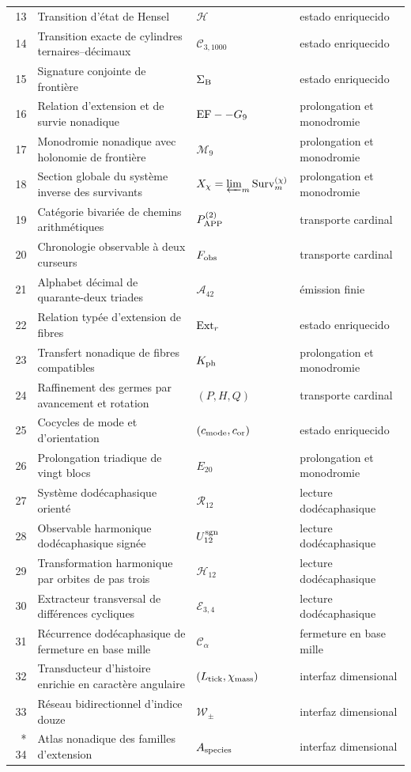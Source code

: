 \begin{longtable}{@{}r >{\raggedright\arraybackslash}p{}
  >{\raggedright\arraybackslash}p{}
  >{\raggedright\arraybackslash}p{}@{}}
13 & Transition d'état de Hensel
  & \(\mathcal H\) & estado enriquecido \\
14 & Transition exacte de cylindres ternaires--décimaux
  & \(\mathcal C_{3,1000}\) & estado enriquecido \\
15 & Signature conjointe de frontière
  & \(\Sigma_{\rm B}\) & estado enriquecido \\
16 & Relation d'extension et de survie nonadique
  & \({\rm EF}\text{--}G_9\) & prolongation et monodromie \\
17 & Monodromie nonadique avec holonomie de frontière
  & \(\mathcal M_9\) & prolongation et monodromie \\
18 & Section globale du système inverse des survivants
  & \(X_\chi=\varprojlim_m{\rm Surv}^{(\chi)}_m\)
  & prolongation et monodromie \\
19 & Catégorie bivariée de chemins arithmétiques
  & \(\mathcal P_{\rm APP}^{(2)}\) & transporte cardinal \\
20 & Chronologie observable à deux curseurs
  & \(F_{\rm obs}\) & transporte cardinal \\
21 & Alphabet décimal de quarante-deux triades
  & \(\mathcal A_{42}\) & émission finie \\
22 & Relation typée d'extension de fibres
  & \({\rm Ext}_r\) & estado enriquecido \\
23 & Transfert nonadique de fibres compatibles
  & \(K_{\rm ph}\) & prolongation et monodromie \\
24 & Raffinement des germes par avancement et rotation
  & \((P,H,Q)\) & transporte cardinal \\
25 & Cocycles de mode et d'orientation
  & \((c_{\rm mode},c_{\rm or})\) & estado enriquecido \\
26 & Prolongation triadique de vingt blocs
  & \(E_{20}\) & prolongation et monodromie \\
27 & Système dodécaphasique orienté
  & \(\mathcal R_{12}\) & lecture dodécaphasique \\
28 & Observable harmonique dodécaphasique signée
  & \(U_{12}^{\rm sgn}\) & lecture dodécaphasique \\
29 & Transformation harmonique par orbites de pas trois
  & \(\mathcal H_{12}\) & lecture dodécaphasique \\
30 & Extracteur transversal de différences cycliques
  & \(\mathcal E_{3,4}\) & lecture dodécaphasique \\
31 & Récurrence dodécaphasique de fermeture en base mille
  & \(\mathcal C_\alpha\) & fermeture en base mille \\
32 & Transducteur d'histoire enrichie en caractère angulaire
  & \((L_{\rm tick},\chi_{\rm mass})\) & interfaz dimensional \\
33 & Réseau bidirectionnel d'indice douze
  & \(\mathcal W_{\pm}\) & interfaz dimensional \\*
34 & Atlas nonadique des familles d'extension
  & \(\mathcal A_{\rm species}\) & interfaz dimensional \\
\bottomrule
\end{longtable}
\endgroup

